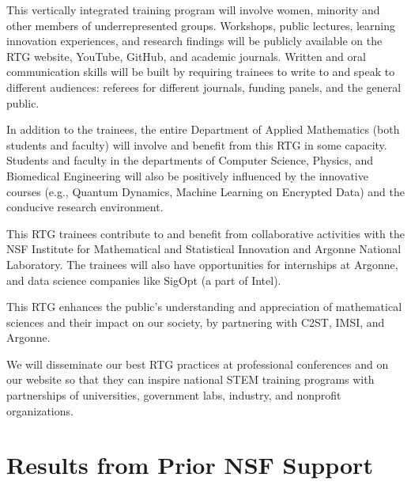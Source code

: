 \documentclass[11pt]{NSFamsart}
\begin{document}
This vertically integrated training program will involve women, minority     and other members of underrepresented groups. Workshops, public lectures, learning innovation experiences, and research findings will be publicly available on the  RTG website, YouTube, GitHub, and academic journals. Written and oral communication skills will be built by requiring trainees to write to and speak to different audiences: referees for different journals, funding panels, and the general public. 

In addition to the   trainees, the entire Department of Applied Mathematics (both students and faculty) will   involve and benefit from this RTG in some capacity.    Students and faculty in the departments of Computer Science, Physics, and Biomedical Engineering will also be positively influenced by the innovative courses (e.g., Quantum Dynamics, Machine Learning on Encrypted Data) and the conducive research environment. 
 
This RTG trainees contribute to and benefit from collaborative activities with the NSF Institute for Mathematical and Statistical Innovation  and Argonne National Laboratory. The trainees will also have opportunities for internships at Argonne, and data science companies like SigOpt (a part of Intel).

This RTG enhances the public’s understanding and appreciation of mathematical sciences     and their impact on our society, by partnering with C2ST, IMSI, and Argonne. 
 
We will disseminate our best RTG practices at professional conferences and on our website so that they can inspire national STEM  training programs with partnerships of universities, government labs, industry, and nonprofit organizations.

 
\section{Results from Prior NSF Support}

 
\end{document}
